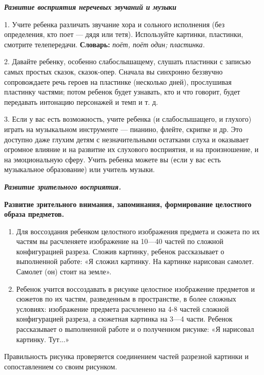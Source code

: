 \documentclass{book}
\renewcommand{\emph}[1]{\textit{#1}}
\begin{document}
\emph{\textbf{Развитие восприятия неречевых звучаний и музыки}}

1. Учите ребенка различать звучание хора и сольного исполнения (без
определения, кто поет --- дядя или тетя). Используйте картинки,
пластинки, смотрите телепередачи. \textbf{Словарь:} \emph{поёт, поёт
один; пластинка.}

2. Давайте ребенку, особенно слабослышащему, слушать пластинки с записью
самых простых сказок, сказок-опер. Сначала вы синхронно беззвучно
сопровождаете речь героев на пластинке (несколько дней), прослушивая
пластинку частями; потом ребенок будет узнавать, кто и что говорит,
будет передавать интонацию персонажей и темп и т. д.

3. Если у вас есть возможность, учите ребенка (и слабослышащего, и
глухого) играть на музыкальном инструменте --- пианино, флейте, скрипке
и др. Это доступно даже глухим детям с незначительными остатками слуха и
оказывает огромное влияние и на развитие их слухового восприятия, и на
произношение, и на эмоциональную сферу. Учить ребенка можете вы (если у
вас есть музыкальное образование) или учитель музыки.

\emph{\textbf{Развитие зрительного восприятия.}}

\textbf{Развитие зрительного внимания, запоминания, формирование
целостного образа предметов.}


\begin{enumerate}
\def\labelenumi{\arabic{enumi}.}
\item
  
  Для воссоздания ребенком целостного изображения предмета и сюжета по
  их частям вы расчленяете изображение на 10---40 частей по сложной
  конфигурацией разреза. Сложив картинку, ребенок рассказывает о
  выполненной работе: «Я сложил картинку. На картинке нарисован самолет.
  Самолет (он) стоит на земле».
  
\item
  
  Ребенок учится воссоздавать в рисунке целостное изображение предметов
  и сюжетов по их частям, разведенным в пространстве, в более сложных
  условиях: изображение предмета расчленено на 4-8 частей сложной
  конфигурацией разреза, а сюжетная картинка на 3---4 части. Ребенок
  рассказывает о выполненной работе и о полученном рисунке: «Я нарисовал
  картинку. Тут...»
  
\end{enumerate}


Правильность рисунка проверяется соединением частей разрезной картинки и
сопоставлением со своим рисунком.
\end{document}
